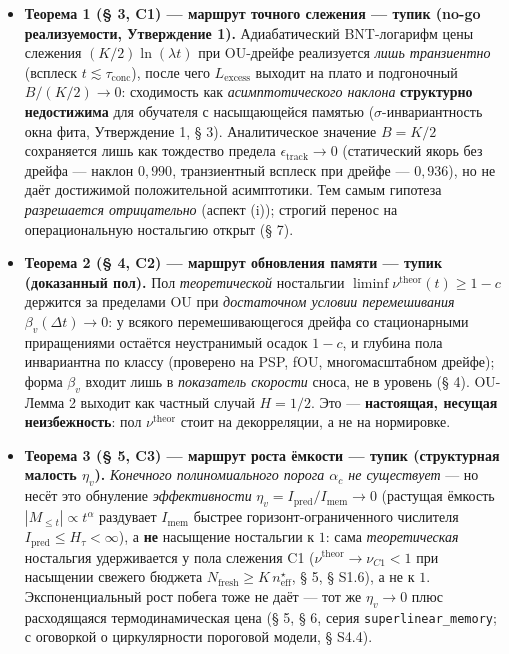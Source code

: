 \documentclass[12pt]{iopart}
\providecommand{\tightlist}{\setlength{\itemsep}{0pt}\setlength{\parskip}{0pt}}
\begin{document}
\begin{itemize}

\tightlist

\item

  \textbf{Теорема 1 (§ 3, C1) --- маршрут точного слежения --- тупик (no-go реализуемости, Утверждение 1).} Адиабатический BNT-логарифм цены слежения \((K/2)\ln(\lambda t)\) при OU-дрейфе реализуется \emph{лишь транзиентно} (всплеск \(t \lesssim \tau_{\text{conc}}\)), после чего \(L_{\text{excess}}\) выходит на плато и подгоночный \(B/(K/2) \to 0\): сходимость как \emph{асимптотического наклона} \textbf{структурно недостижима} для обучателя с насыщающейся памятью (\(\sigma\)-инвариантность окна фита, Утверждение 1, § 3). Аналитическое значение \(B = K/2\) сохраняется лишь как тождество предела \(\epsilon_{\text{track}} \to 0\) (статический якорь без дрейфа --- наклон \(0{,}990\), транзиентный всплеск при дрейфе --- \(0{,}936\)), но не даёт достижимой положительной асимптотики. Тем самым гипотеза \cite{Andriishin2026b} \emph{разрешается отрицательно} (аспект (i)); строгий перенос на операциональную ностальгию открыт (§ 7).

\item

  \textbf{Теорема 2 (§ 4, C2) --- маршрут обновления памяти --- тупик (доказанный пол).} Пол \emph{теоретической} ностальгии \(\liminf \nu^{\text{theor}}(t) \ge 1 - c\) держится за пределами OU при \emph{достаточном условии перемешивания} \(\beta_v(\Delta t) \to 0\): у всякого перемешивающегося дрейфа со стационарными приращениями остаётся неустранимый осадок \(1 - c\), и глубина пола инвариантна по классу (проверено на PSP, fOU, многомасштабном дрейфе); форма \(\beta_v\) входит лишь в \emph{показатель скорости} сноса, не в уровень (§ 4). OU-Лемма 2 \cite{Andriishin2026b} выходит как частный случай \(H = 1/2\). Это --- \textbf{настоящая, несущая неизбежность}: пол \(\nu^{\text{theor}}\) стоит на декорреляции, а не на нормировке.

\item

  \textbf{Теорема 3 (§ 5, C3) --- маршрут роста ёмкости --- тупик (структурная малость \(\eta_v\)).} \emph{Конечного полиномиального порога \(\alpha_c\) не существует} --- но несёт это обнуление \emph{эффективности} \(\eta_v = I_{\text{pred}}/I_{\text{mem}} \to 0\) (растущая ёмкость \(|M_{\le t}| \propto t^\alpha\) раздувает \(I_{\text{mem}}\) быстрее горизонт-ограниченного числителя \(I_{\text{pred}} \le H_\tau < \infty\)), а \textbf{не} насыщение ностальгии к \(1\): сама \emph{теоретическая} ностальгия удерживается у пола слежения C1 (\(\nu^{\text{theor}} \to \nu_{C1} < 1\) при насыщении свежего бюджета \(N_{\text{fresh}} \ge K\,n_{\text{eff}}^\star\), § 5, § S1.6), а не к \(1\). Экспоненциальный рост побега тоже не даёт --- тот же \(\eta_v \to 0\) плюс расходящаяся термодинамическая цена (§ 5, § 6, серия \texttt{superlinear\_memory}; с оговоркой о циркулярности пороговой модели, § S4.4).

\end{itemize}
\end{document}
